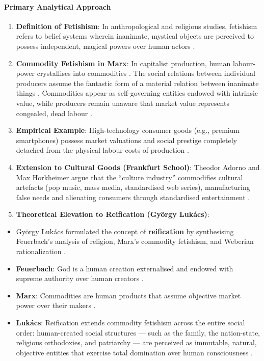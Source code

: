 \paragraph{Primary Analytical Approach}
\begin{enumerate}
    \item \textbf{Definition of Fetishism}: In anthropological and religious studies, fetishism refers to belief systems wherein inanimate, mystical objects are perceived to possess independent, magical powers over human actors .
    \item \textbf{Commodity Fetishism in Marx}: In capitalist production, human labour-power crystallises into commodities . The social relations between individual producers assume the fantastic form of a material relation between inanimate things . Commodities appear as self-governing entities endowed with intrinsic value, while producers remain unaware that market value represents congealed, dead labour .
    \item \textbf{Empirical Example}: High-technology consumer goods (e.g., premium smartphones) possess market valuations and social prestige completely detached from the physical labour costs of production .
    \item \textbf{Extension to Cultural Goods (Frankfurt School)}: Theodor Adorno and Max Horkheimer argue that the ``culture industry'' commodifies cultural artefacts (pop music, mass media, standardised web series), manufacturing false needs and alienating consumers through standardised entertainment .
    \item \textbf{Theoretical Elevation to Reification (Gy\"orgy Luk\'acs)}:
\end{enumerate}

\begin{KeyConcept}
\begin{itemize}
    \item Gy\"orgy Luk\'acs formulated the concept of \textbf{reification} by synthesising Feuerbach's analysis of religion, Marx's commodity fetishism, and Weberian rationalization .
    \item \textbf{Feuerbach}: God is a human creation externalised and endowed with supreme authority over human creators .
    \item \textbf{Marx}: Commodities are human products that assume objective market power over their makers .
    \item \textbf{Luk\'acs}: Reification extends commodity fetishism across the entire social order: human-created social structures --- such as the family, the nation-state, religious orthodoxies, and patriarchy --- are perceived as immutable, natural, objective entities that exercise total domination over human consciousness .
\end{itemize}
\end{KeyConcept}


